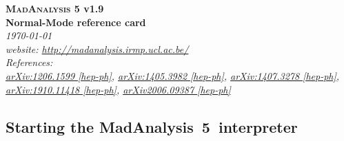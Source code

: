 \documentclass[a4paper]{article}
\newcommand{\MAnorm}{{MadAnalysis}~5}
\begin{document}
\begin{center} 
{\color{ao} \huge \textbf{\textsc{MadAnalysis} 5 v1.9}} \\ \vspace{0.25cm}
{\color{ao} \huge \textbf{Normal-Mode reference card}} \\ \vspace{0.25cm}
\vspace{0.1cm} \textsl{\today}\\
\vspace{0.1cm} \textsl{website: \url{http://madanalysis.irmp.ucl.ac.be/}}\\
\vspace{0.1cm} \textsl{References:\\ \href{https://arxiv.org/abs/1206.1599}{arXiv:1206.1599 [hep-ph]}, \href{https://arxiv.org/abs/1405.3982}{arXiv:1405.3982 [hep-ph]}, 
\href{https://arxiv.org/abs/1407.3278}{arXiv:1407.3278 [hep-ph]},\\
\href{https://arxiv.org/abs/1910.11418}{arXiv:1910.11418 [hep-ph]},
\href{https://arxiv.org/abs/2006.09387}{arXiv2006.09387 [hep-ph]}
}
\end{center}

\hspace{0.5cm}

\begin{shaded}
\section{\Large Starting the \MAnorm\ interpreter}
\end{shaded}
\end{document}
